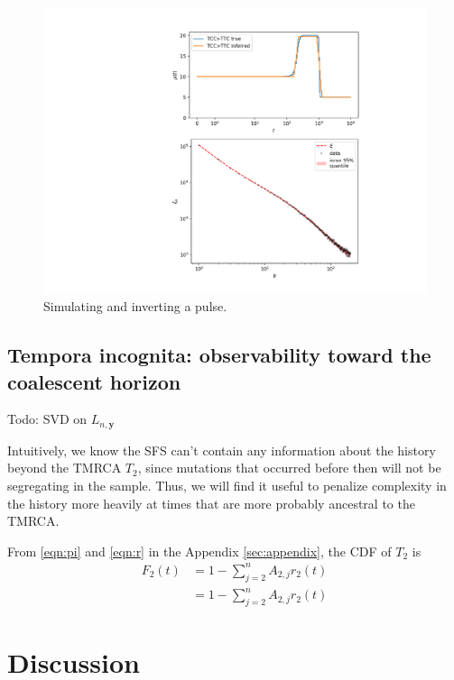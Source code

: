 \documentclass[11pt]{article}
\begin{document}

\begin{figure}
  \centering
  \includegraphics[width=.7\textwidth]{figures/fit_teaser}
  \caption{Simulating and inverting a pulse.}
  \label{}
\end{figure}

\subsection*{Tempora incognita: observability toward the coalescent horizon}\label{sec:model:loss}

Todo: SVD on $L_{n, \boldsymbol y}$

Intuitively, we know the SFS can't contain any information about the history beyond the TMRCA $T_2$, since mutations that occurred before then will not be segregating in the sample.
Thus, we will find it useful to penalize complexity in the history more heavily at times that are more probably ancestral to the TMRCA.

From \eqref{eqn:pi} and \eqref{eqn:r} in the Appendix \ref{sec:appendix}, the CDF of $T_2$ is
\begin{align}
F_2(t) &= 1 - \sum_{j=2}^n A_{2,j}r_2(t)\\
&= 1 - \sum_{j=2}^n A_{2,j}r_2(t)
\end{align}

\section*{Discussion}\label{sec:discussion}
\end{document}
